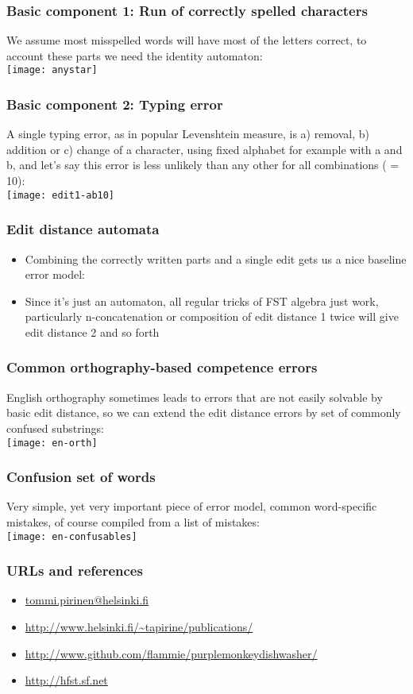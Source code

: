 \documentclass{beamer}
\begin{document}
\begin{frame}
    \frametitle{Basic component 1: Run of correctly spelled characters}
    We assume most misspelled words will have most of the letters correct,
    to account these parts we need the identity automaton:\\
    \texttt{[image: anystar]}
\end{frame}

\begin{frame}
    \frametitle{Basic component 2: Typing error}
    A single typing error, as in popular Levenshtein measure, is
    a) removal, b) addition or c) change of a character, using fixed alphabet
    for example with a and b, and let's say this error is less unlikely than
    any other for all combinations ( = 10):\\
    \texttt{[image: edit1-ab10]}
\end{frame}


\begin{frame}
    \frametitle{Edit distance automata}
    \begin{itemize}
        \item Combining the correctly written parts and a single edit gets us
            a nice baseline error model: 
        \item Since it's just an automaton, all regular tricks of FST algebra
            just work, particularly n-concatenation or composition of edit 
            distance 1 twice will give edit distance 2 and so forth
    \end{itemize}
\end{frame}


\begin{frame}
    \frametitle{Common orthography-based competence errors}
    English orthography sometimes leads to errors that are not
    easily solvable by basic edit distance, so we can extend the
    edit distance errors by set of commonly confused substrings:\\
    \texttt{[image: en-orth]}
\end{frame}

\begin{frame}
    \frametitle{Confusion set of words}
    Very simple, yet very important piece of error model, common word-specific
    mistakes, of course compiled from a list of mistakes:\\
    \texttt{[image: en-confusables]}
\end{frame}

\begin{frame}
    \frametitle{URLs and references}
    \begin{itemize}
        \item \url{tommi.pirinen@helsinki.fi}
        \item \url{http://www.helsinki.fi/~tapirine/publications/}
        \item \url{http://www.github.com/flammie/purplemonkeydishwasher/}
        \item \url{http://hfst.sf.net}
    \end{itemize}
\end{frame}
\end{document}
